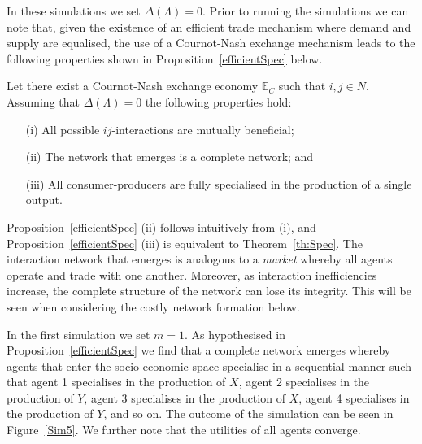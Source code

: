 In these simulations we set $\Delta(\Lambda) = 0$. Prior to running the simulations we can note that, given the existence of an efficient trade mechanism where demand and supply are equalised, the use of a Cournot-Nash exchange mechanism leads to the following properties shown in Proposition~\ref{efficientSpec} below.

\begin{proposition} \label{efficientSpec}
Let there exist a Cournot-Nash exchange economy $\mathbb{E}_{C}$ such that $i,j \in N$. Assuming that $\Delta(\Lambda) = 0$ the following properties hold:
\begin{itemize}
	\item[(i)] All possible $ij$-interactions are mutually beneficial;
	\item[(ii)] The network that emerges is a complete network; and
	\item[(iii)] All consumer-producers are fully specialised in the production of a single output.
\end{itemize}
\end{proposition}

Proposition~\ref{efficientSpec} (ii) follows intuitively from (i), and Proposition~\ref{efficientSpec} (iii) is equivalent to Theorem~\ref{th:Spec}. The interaction network that emerges is analogous to a \emph{market} whereby all agents operate and trade with one another. Moreover, as interaction inefficiencies increase, the complete structure of the network can lose its integrity. This will be seen when considering the costly network formation below.

In the first simulation we set $m = 1$. As hypothesised in Proposition~\ref{efficientSpec} we find that a complete network emerges whereby agents that enter the socio-economic space specialise in a sequential manner such that agent 1 specialises in the production of $X$, agent 2 specialises in the production of $Y$, agent 3 specialises in the production of $X$, agent 4 specialises in the production of $Y$, and so on. The outcome of the simulation can be seen in Figure~\ref{Sim5}. We further note that the utilities of all agents converge.

